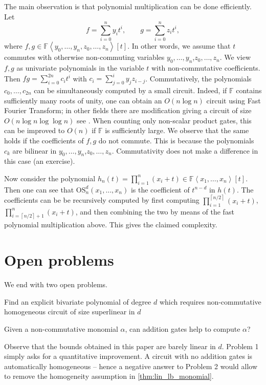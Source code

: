 \documentclass[10pt,a4paper]{article}
\def\Field{\mathbb{F}}
\let\F\Field
\def\ceil#1{\left\lceil #1 \right\rceil}
\def\inangle#1{\left\langle #1 \right\rangle}
\newcommand{\esym}[2]{\mathrm{OS}_{#1}^{#2}}
\begin{document}
The main observation is that polynomial multiplication can be done efficiently. Let
\[ 
  f= \sum_{i=0}^n y_i t^i, \qquad g= \sum_{i=0}^n z_i t^i,  
\] 
where $f,g\in \F\inangle{y_0,\dots, y_n, z_0,\dots, z_n}[t]$. 
In other words, we assume that $t$ commutes with otherwise non-commuting variables $y_0,\dots, y_n$,$ z_0,\dots, z_n$. 
We view  $f,g$ as univariate polynomials in the variable $t$ with non-commutative coefficients. 
Then $fg= \sum_{i=0}^{2n} c_i t^i $ with $c_i=\sum_{j=0}^i y_j z_{i-j}$. 
Commutatively, the polynomials $c_0,\dots,c_{2n}$ can be simultaneously computed by a small circuit.
Indeed, if $\F$ contains sufficiently many roots of unity, one can obtain an $O(n\log n)$ circuit using Fast Fourier Transform; in other fields there are modification giving a circuit of size $O(n\log n\log\log n)$ {see \cite{SS71, BCS97}}. 
When counting only non-scalar product gates, this can be improved to $O(n)$ if $\F$ is sufficiently large.  
We observe that the same holds if the coefficients of $f,g$ do not commute. 
This is because the polynomials $c_k$ are bilinear in $y_0,\dots, y_n$,$ z_0,\dots, z_n$. 
Commutativity does not make a difference in this case (an exercise). 

Now consider the polynomial $h_n(t)=\prod_{i=1}^{n} (x_i + t) \in \F\inangle{x_1, \ldots, x_n}[t]$. 
Then one can see that $\esym{n}{d}(x_1,\dots,x_n)$ is the coefficient of $t^{n-d}$ in $h(t)$. 
The coefficients can be be recursively computed by first computing $\prod_{i=1}^{\ceil{n/2}} (x_i + t)$,  $\prod_{i=\ceil{n/2}+1}^n (x_i + t)$, and then combining the two by means of the fast polynomial multiplication above. 
This gives the claimed complexity.

\section{Open problems}
We end with two open problems. 

\begin{openproblem} 
  Find an explicit bivariate polynomial of degree $d$ which requires non-commutative homogeneous circuit of size superlinear in $d$
\end{openproblem}

\begin{openproblem} 
  Given a non-commutative monomial $\alpha$, can addition gates help to compute $\alpha$? 
\end{openproblem}

Observe that the bounds obtained in this paper are barely linear in $d$. Problem 1 simply asks for a quantitative improvement. A circuit with no addition gates is automatically homogeneous -- hence a negative answer to Problem 2 would allow to remove the homogeneity assumption in \autoref{thm:lin_lb_monomial}. 
\end{document}
